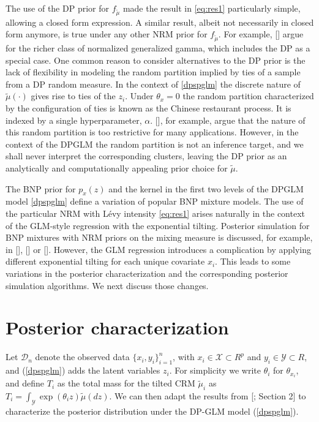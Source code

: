 \documentclass{article}[12pt]
\newcommand{\YY}{\mathcal{Y}}
\newcommand{\citeab}[1]{\citeauthor{#1} [\href{cite.#1}{\textcolor{blue}{\citeyear{#1}}}]}  %
\newcommand{\citeac}[2]{\citeauthor{#1} [\href{cite.#1}{\textcolor{blue}{\citeyear{#1}}}; #2]}  %
\newcommand{\refa}[1]{\textcolor{blue}{\ref{#1}}} %
\renewcommand{\th}{\theta}
\newcommand{\tmu}{\widetilde{\mu}}
\newcommand{\sx}{\mathcal{X}}
\newcommand{\sy}{\mathcal{Y}}
\renewcommand{\sx}{\mathcal{X}}
\renewcommand{\sy}{\mathcal{Y}}
\newcommand{\sd}{\mathcal{D}}
\begin{document}
The use of the DP prior for $f_{\tmu}$ made the result in
\eqref{eq:res1} particularly simple, allowing a closed form
expression. A similar result, albeit not necessarily in closed form
anymore, is true under any other NRM prior for 
$f_{\tmu}$. For example, \citeab{lijoi&mena&pruenster:07} argue for the
richer class of normalized generalized gamma, which includes the DP as
a special case.
One common reason to consider alternatives to the DP prior is the lack
of flexibility in modeling the random partition implied by ties of a
sample from a DP random measure. In the context of \eqref{dpspglm} the
discrete nature of $\tmu(\cdot)$ gives rise to ties of the
$z_i$. Under $\th_x=0$ the random partition characterized by the
configuration of ties is known as the Chinese restaurant process. It
is indexed by a single hyperparameter, $\alpha$.
\citeab{de2013gibbs}, for example, argue that the nature of this random
partition is too restrictive for many applications.
However, in the context of the DPGLM the random partition is not an
inference target, and we shall never interpret the corresponding
clusters, leaving the DP prior as an analytically and computationally
appealing prior choice for $\tmu$.

The BNP prior for $p_x(z)$ and the kernel in the first two levels of
the DPGLM model \eqref{dpspglm} define a variation of popular BNP
mixture models. The use of the particular NRM with L\'evy intensity
\eqref{eq:res1} arises naturally in the context of the GLM-style
regression with the exponential tilting.
Posterior simulation for BNP mixtures with NRM priors on the mixing
measure is discussed, for example, in
\citeab{Argiento:2010}, \citeab{barrios&al:13} or \citeab{favaro&teh:13}.
However, the GLM regression introduces a complication by applying
different exponential tilting for each unique covariate $x_i$.
This leads to some variations in the posterior characterization and
the corresponding posterior simulation algorithms. We next discuss those changes. 

\section{Posterior characterization}
\label{sec:post}
Let $\sd_n$ denote the observed data $\{x_i, y_i\}_{i=1}^n$, with $x_i
\in \sx \subset R^p$ and $y_i \in \sy \subset R$,
and (\refa{dpspglm}) adds the latent variables  $z_i$. 
For simplicity we write $\theta_i$ for $\theta_{x_i}$, and define
$T_i$ as the total mass for the 
tilted CRM $\tmu_i$ as $T_i = \int_{\YY} \exp (\th_i z) \tmu(dz)$. We can then adapt the results from
\citeac{james2009posterior}{Section 2}
to characterize the posterior distribution under the DP-GLM model
(\refa{dpspglm}).
\end{document}
